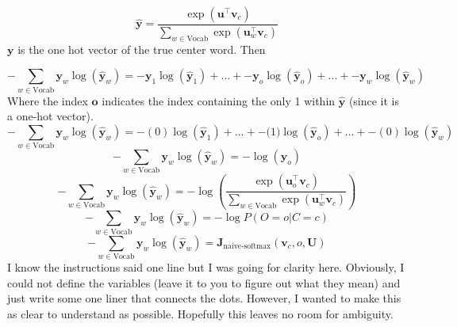 \documentclass[12pt]{article}
\begin{document}
\begin{equation*}
    \hat{\bm y} = 
    \frac{\exp(\bm u^\top \bm v_c)}{\sum_{w \in \text{Vocab}} \exp(\bm u_{w}^\top \bm v_c)}
\end{equation*}
$\bm y$ is the one hot vector of the true center word. Then

\begin{equation*} 
    -\sum_{w \in \text{Vocab}} \bm y_w \log(\hat{\bm y}_w) = 
    \bm -\bm y_1 \log(\hat{\bm y}_1) + ... + -\bm y_o \log(\hat{\bm y}_o) + ... + -\bm y_w \log(\hat{\bm y}_w)
\end{equation*}    
Where the index $\bm o$ indicates the index containing the only 1 within $\hat {\bm y}$ (since it is a one-hot vector). 
\begin{equation*} 
    -\sum_{w \in \text{Vocab}} \bm y_w \log(\hat{\bm y}_w) = 
    \bm - (0)\log(\hat{\bm y}_1) + ... + -\bm (1) \log(\hat{\bm y}_o) + ... + - (0) \log(\hat{\bm y}_w)
\end{equation*}    
\begin{equation*} 
    -\sum_{w \in \text{Vocab}} \bm y_w \log(\hat{\bm y}_w) = 
    -\log(\hat{\bm y}_o)
\end{equation*}    
\begin{equation*} 
    -\sum_{w \in \text{Vocab}} \bm y_w \log(\hat{\bm y}_w) = 
    - \log(\frac{\exp(\bm u_o^\top \bm v_c)}{\sum_{w \in \text{Vocab}} \exp(\bm u_{w}^\top \bm v_c)})
\end{equation*}    
\begin{equation*} 
    -\sum_{w \in \text{Vocab}} \bm y_w \log(\hat{\bm y}_w) = 
    - \log P(O=o| C=c)
\end{equation*}   
\begin{equation*} 
    -\sum_{w \in \text{Vocab}} \bm y_w \log(\hat{\bm y}_w) = 
    \bm J_{\text{naive-softmax}}(\bm v_c, o, \bm U)
\end{equation*}     
I know the instructions said one line but I was going for clarity here. Obviously, I could not define
the variables (leave it to you to figure out what they mean) and just write some 
one liner that connects the dots. However, I wanted to make this as clear to understand as possible. 
Hopefully this leaves no room for ambiguity. 

\end{document}
